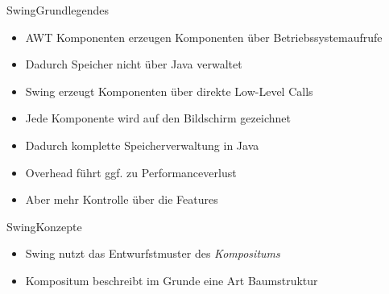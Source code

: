 \begin{frame}{Swing}{Grundlegendes}
	\begin{itemize}
		\item AWT Komponenten erzeugen Komponenten über Betriebssystemaufrufe
		\item Dadurch Speicher nicht über Java verwaltet
		\item Swing erzeugt Komponenten über direkte Low-Level Calls
		\item Jede Komponente wird auf den Bildschirm gezeichnet
		\item Dadurch komplette Speicherverwaltung in Java
		\item Overhead führt ggf. zu Performanceverlust
		\item Aber mehr Kontrolle über die Features
	\end{itemize}
\end{frame}

\begin{frame}{Swing}{Konzepte}
	\begin{itemize}
		\item Swing nutzt das Entwurfstmuster des \textit{Kompositums}
		\item Kompositum beschreibt im Grunde eine Art Baumstruktur
	\end{itemize}
\end{frame}